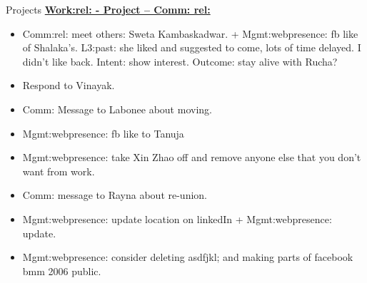 \begin{block}{Projects}
\underline{\bf Work:rel: -  Project – Comm: rel:} 
\begin{itemize} 
\item \tiny Comm:rel: meet others:  Sweta Kambaskadwar. + Mgmt:webpresence: fb
like of Shalaka’s. L3:past: she liked and suggested to come, lots of
time delayed. I didn’t like back.  Intent: show interest. Outcome:
stay alive with Rucha?
\item \tiny Respond to Vinayak. 
\item \tiny Comm: Message to Labonee about moving.
\item \tiny Mgmt:webpresence: fb like to Tanuja
\item \tiny Mgmt:webpresence: take Xin Zhao off and remove anyone else that you
don’t want from work.
\item \tiny Comm: message to Rayna about re-union. 
\item \tiny Mgmt:webpresence: update location on linkedIn + Mgmt:webpresence:
update.
\item \tiny Mgmt:webpresence: consider deleting asdfjkl;  and making
parts of facebook bmm 2006 public. 
\end{itemize}

\end{block}

